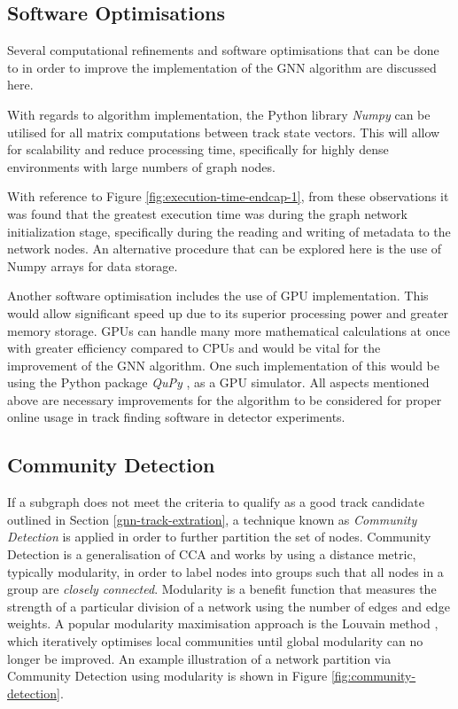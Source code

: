 \subsection{Software Optimisations}

Several computational refinements and software optimisations that can be done to in order to improve the implementation of the GNN algorithm are discussed here.

With regards to algorithm implementation, the Python library \textit{Numpy} \cite{harris2020array} can be utilised for all matrix computations between track state vectors. This will allow for scalability and reduce processing time, specifically for highly dense environments with large numbers of graph nodes. 

With reference to Figure \ref{fig:execution-time-endcap-1}, from these observations it was found that the greatest execution time was during the graph network initialization stage, specifically during the reading and writing of metadata to the network nodes. An alternative procedure that can be explored here is the use of Numpy arrays for data storage.

Another software optimisation includes the use of GPU implementation. This would allow significant speed up due to its superior processing power and greater memory storage. GPUs can handle many more mathematical calculations at once with greater efficiency compared to CPUs and would be vital for the improvement of the GNN algorithm. One such implementation of this would be using the Python package \textit{QuPy} \cite{qupy}, as a GPU simulator. All aspects mentioned above are necessary improvements for the algorithm to be considered for proper online usage in track finding software in detector experiments.







\subsection{Community Detection}

If a subgraph does not meet the criteria to qualify as a good track candidate outlined in Section \ref{gnn-track-extration}, a technique known as \textit{Community Detection} \cite{community} is applied in order to further partition the set of nodes. Community Detection is a generalisation of CCA and works by using a distance metric, typically modularity, in order to label nodes into groups such that all nodes in a group are \textit{closely connected}. Modularity is a benefit function that measures the strength of a particular division of a network using the number of edges and edge weights. A popular modularity maximisation approach is the Louvain method \cite{python_louvain}, which iteratively optimises local communities until global modularity can no longer be improved. An example illustration of a network partition via Community Detection using modularity is shown in Figure \ref{fig:community-detection}. 

